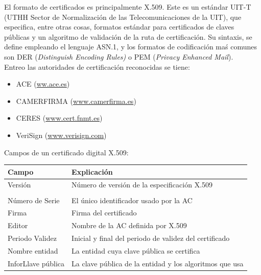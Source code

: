 \documentclass[a4paper,11pt]{article}
\begin{document}
El formato de certificados es principalmente X.509. Este es un estándar UIT-T (UTHH Sector de Normalización de las Telecomunicaciones de la UIT), que especifica, entre otras cosas, formatos estándar para certificados de claves públicas y un algoritmo de validación de la ruta de certificación. Su sintaxis, se define empleando el lenguaje ASN.1, y los formatos de codificación maś comunes son DER (\textit{Distinguish Encoding Rules)} o PEM (\textit{Privacy Enhanced Mail}). \\

Entreo las autoridades de certificación reconocidas se tiene:

\begin{itemize}
\item ACE (\url{ww.ace.es})
\item CAMERFIRMA (\url{www.camerfirma.es})
\item CERES (\url{www.cert.fnmt.es})
\item VeriSign (\url{www.verisign.com})
\end{itemize}


Campos de un certificado digital X.509:

\begin{tabular}{|l|l|}
\hline
Campo & Explicación \\
\hline
Versión & Número de versión de la especificación X.509 \\
\\\hline
Número de Serie & El único identificador usado por la AC \\
\hline
Firma & Firma del certificado \\
\hline
Editor & Nombre de la AC definida por X.509 \\
\hline
Periodo Validez & Inicial y final del periodo de validez del certificado \\
\hline
Nombre entidad & La entidad cuya clave pública se certifica \\
\hline
InforLlave pública & La clave pública de la entidad y los algoritmos que usa \\
\hline
\end{tabular}
\\
\end{document}
